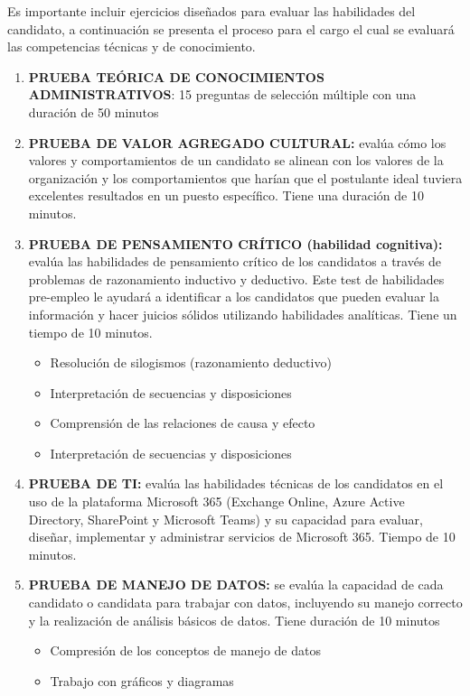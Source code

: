 \documentclass[letterpaper,12pt]{article}
\begin{document}
\begin{sloppypar}
Es importante incluir ejercicios diseñados para evaluar las habilidades del candidato, a continuación se presenta el proceso para el cargo el cual se evaluará las competencias técnicas y de conocimiento.
\begin{enumerate}
    \item \textbf{PRUEBA TEÓRICA DE CONOCIMIENTOS ADMINISTRATIVOS}: 15 preguntas de selección múltiple con una duración de 50 minutos
    \item \textbf{PRUEBA DE VALOR AGREGADO CULTURAL:} evalúa cómo los valores y comportamientos de un candidato se alinean con los valores de la organización y los comportamientos que harían que el postulante ideal tuviera excelentes resultados en un puesto específico. Tiene una duración de 10 minutos. 
    \item \textbf{PRUEBA DE PENSAMIENTO CRÍTICO (habilidad cognitiva):} evalúa las habilidades de pensamiento crítico de los candidatos a través de problemas de razonamiento inductivo y deductivo. Este test de habilidades pre-empleo le ayudará a identificar a los candidatos que pueden evaluar la información y hacer juicios sólidos utilizando habilidades analíticas. Tiene un tiempo de 10 minutos.
    \begin{itemize}
        \item Resolución de silogismos (razonamiento deductivo)
        \item Interpretación de secuencias y disposiciones
        \item Comprensión de las relaciones de causa y efecto
        \item Interpretación de secuencias y disposiciones
    \end{itemize}
    \item \textbf{PRUEBA DE TI:} evalúa las habilidades técnicas de los candidatos en el uso de la plataforma Microsoft 365 (Exchange Online, Azure Active Directory, SharePoint y Microsoft Teams) y su capacidad para evaluar, diseñar, implementar y administrar servicios de Microsoft 365. Tiempo de 10 minutos.
    \item \textbf{PRUEBA DE MANEJO DE DATOS:} se evalúa la capacidad de cada candidato o candidata para trabajar con datos, incluyendo su manejo correcto y la realización de análisis básicos de datos.  Tiene duración de 10 minutos
    \begin{itemize}
        \item Compresión de los conceptos de manejo de datos 
        \item Trabajo con gráficos y diagramas 

\end{itemize}
\end{enumerate}
\end{sloppypar}
\end{document}
